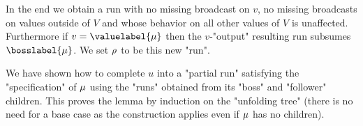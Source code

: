 In the end we obtain a run with no missing broadcast on $v$, no missing broadcasts on values outside of $V$ and whose behavior on all other values of $V$ is unaffected. Furthermore if $v = \valuelabel{\node}$ then the $v$-"output" resulting run subsumes $\bosslabel{\node}$. We set $\rho$ to be this new "run".

We have shown how to complete $u$ into a "partial run" satisfying the "specification" of $\mu$ using the "runs" obtained from its "boss" and "follower" children. This proves the lemma by induction on the "unfolding tree" (there is no need for a base case as the construction applies even if $\mu$ has no children).